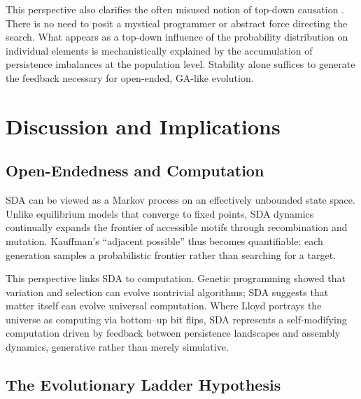 \documentclass[life,article,submit,pdftex,moreauthors]{Definitions/mdpi}
\begin{document}
This perspective also clarifies the often misused notion of top-down causation \cite{noble_dance}. There is no need to posit a mystical programmer or abstract force directing the search. What appears as a top-down influence of the probability distribution on individual elements is mechanistically explained by the accumulation of persistence imbalances at the population level. Stability alone suffices to generate the feedback necessary for open-ended, GA-like evolution.



\section{Discussion and Implications}

\subsection{Open-Endedness and Computation}
SDA can be viewed as a Markov process on an effectively unbounded state space. 
Unlike equilibrium models that converge to fixed points, SDA dynamics continually expands the frontier of accessible motifs through recombination and mutation. 
Kauffman’s “adjacent possible” thus becomes quantifiable: each generation samples a probabilistic frontier rather than searching for a target.  

This perspective links SDA to computation. Genetic programming showed that variation and selection can evolve nontrivial algorithms; SDA suggests that matter itself can evolve universal computation. 
Where Lloyd portrays the universe as computing via bottom–up bit flips, SDA represents a self-modifying computation driven by feedback between persistence landscapes and assembly dynamics, generative rather than merely simulative.  

\subsection{The Evolutionary Ladder Hypothesis}  
\end{document}
